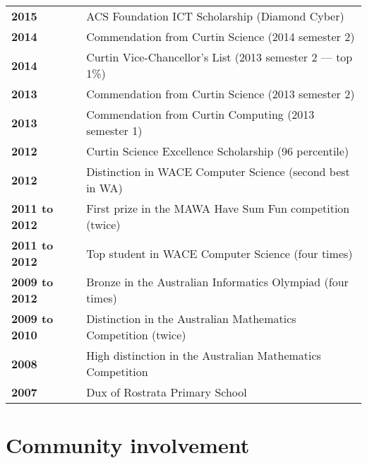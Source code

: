 \documentclass[a4paper,12pt]{article}
\begin{document}
\begin{tabular}{p{35mm}p{125mm}}
	                    \textbf{2015}               & ACS Foundation ICT Scholarship (Diamond Cyber)
	\vspace{0.2em}  \\  \textbf{2014}               & Commendation from Curtin Science (2014 semester 2)
	\vspace{0.2em}  \\  \textbf{2014}               & Curtin Vice-Chancellor's List (2013 semester 2 --- top 1\%)
	\vspace{0.2em}  \\  \textbf{2013}               & Commendation from Curtin Science (2013 semester 2)
	\vspace{0.2em}  \\  \textbf{2013}               & Commendation from Curtin Computing (2013 semester 1)
	\vspace{0.2em}  \\  \textbf{2012}               & Curtin Science Excellence Scholarship (96 percentile)
	\vspace{0.2em}  \\  \textbf{2012}               & Distinction in WACE Computer Science (second best in WA)
	\vspace{0.2em}  \\  \textbf{2011 to 2012}       & First prize in the MAWA Have Sum Fun competition (twice)
	\vspace{0.2em}  \\  \textbf{2011 to 2012}       & Top student in WACE Computer Science (four times)
	\vspace{0.2em}  \\  \textbf{2009 to 2012}       & Bronze in the Australian Informatics Olympiad (four times)
	\vspace{0.2em}  \\  \textbf{2009 to 2010}       & Distinction in the Australian Mathematics Competition (twice)
	\vspace{0.2em}  \\  \textbf{2008}               & High distinction in the Australian Mathematics Competition
	\vspace{0.2em}  \\  \textbf{2007}               & Dux of Rostrata Primary School
\end{tabular}

\section*{Community involvement}
\end{document}
